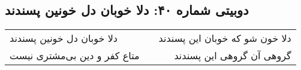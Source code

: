 \begin{center}
\section*{دوبیتی شماره ۴۰: دلا خوبان دل خونین پسندند}
\label{sec:040}
\begin{longtable}{l p{0.5cm} r}
دلا خوبان دل خونین پسندند
&&
دلا خون شو که خوبان این پسندند
\\
متاع کفر و دین بی‌مشتری نیست
&&
گروهی آن گروهی این پسندند
\\
\end{longtable}
\end{center}
